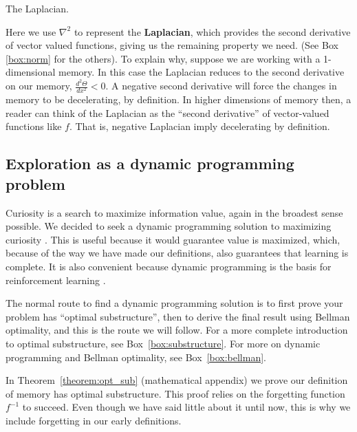 \begin{featurebox}
	\caption{The Laplacian.}
	\label{box:laplacian}
	Here we use $\nabla^2$ to represent the \textbf{Laplacian}, which provides the second derivative of vector valued functions, giving us the remaining property we need. (See Box \ref{box:norm} for the others). To explain why, suppose we are working with a 1- dimensional memory. In this case the Laplacian reduces to the second derivative on our memory, $\frac{d^2\Theta}{dx^2} < 0$. A negative second derivative will force the changes in memory to be decelerating, by definition. In higher dimensions of memory then, a reader can think of the Laplacian as the ``second derivative'' of vector-valued functions like $f$. That is, negative Laplacian imply decelerating by definition.
	\medskip
\end{featurebox}


\subsection{Exploration as a dynamic programming problem}
Curiosity is a search to maximize information value, again in the broadest sense possible. We decided to seek a dynamic programming solution to maximizing curiosity \citep{Bellmann1954}. This is useful because it would guarantee value is maximized, which, because of the way we have made our definitions, also guarantees that learning is complete. It is also convenient because dynamic programming is the basis for reinforcement learning \citep{Sutton2018}. 

The normal route to find a dynamic programming solution is to first prove your problem has ``optimal substructure'', then to derive the final result using Bellman optimality, and this is the route we will follow. For a more complete introduction to optimal substructure, see Box~\ref{box:substructure}. For more on dynamic programming and Bellman optimality, see Box~\ref{box:bellman}. 

In Theorem~\ref{theorem:opt_sub} (mathematical appendix) we prove our definition of memory has optimal substructure. This proof relies on the forgetting function $f^{-1}$ to succeed. Even though we have said little about it until now, this is why we include forgetting in our early definitions. 

